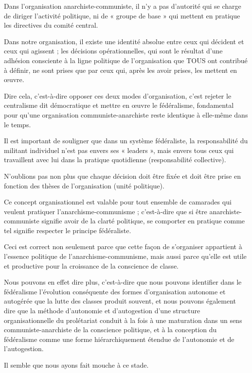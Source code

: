 Dans l'organisation anarchiste-communiste, il n'y a pas d'autorité qui se charge de diriger l'activité politique, ni de « groupe de base » qui mettent en pratique les directives du comité central.

Dans notre organisation, il existe une identité absolue entre ceux qui décident et ceux qui agissent ; les décisions opérationnelles, qui sont le résultat d'une adhésion consciente à la ligne politique de l'organisation que TOUS ont contribué à définir, ne sont prises que par ceux qui, après les avoir prises, les mettent en œuvre.

Dire cela, c'est-à-dire opposer ces deux modes d'organisation, c'est rejeter le centralisme dit démocratique et mettre en œuvre le fédéralisme, fondamental pour qu'une organisation communiste-anarchiste reste identique à elle-même dans le temps.

Il est important de souligner que dans un système fédéraliste, la responsabilité du militant individuel n'est pas envers ses « leaders », mais envers tous ceux qui travaillent avec lui dans la pratique quotidienne (responsabilité collective).

N'oublions pas non plus que chaque décision doit être fixée et doit être prise en fonction des thèses de l'organisation (unité politique).

Ce concept organisationnel est valable pour tout ensemble de camarades qui veulent pratiquer l'anarchisme-communisme ; c'est-à-dire que si être anarchiste-communiste signifie avoir de la clarté politique, se comporter en pratique comme tel signifie respecter le principe fédéraliste.

Ceci est correct non seulement parce que cette façon de s'organiser appartient à l'essence politique de l'anarchisme-communisme, mais aussi parce qu'elle est utile et productive pour la croissance de la conscience de classe.

Nous pouvons en effet dire plus, c'est-à-dire que nous pouvons identifier dans le fédéralisme l'évolution conséquente des formes d'organisation autonome et autogérée que la lutte des classes produit souvent, et nous pouvons également dire que la méthode d'autonomie et d'autogestion d'une structure organisationnelle du prolétariat conduit à la fois à une maturation dans un sens communiste-anarchiste de la conscience politique, et à la conception du fédéralisme comme une forme hiérarchiquement étendue de l'autonomie et de l'autogestion.

Il semble que nous ayons fait mouche à ce stade.

